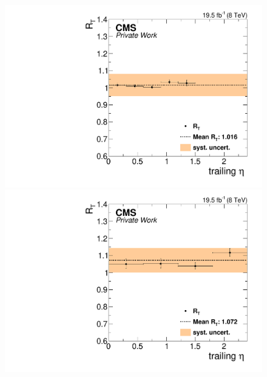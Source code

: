 \begin{figure}[htbp]
\centering
\begin{minipage}[t]{0.49\textwidth}
  \includegraphics[width=\textwidth]{plots/BG/trigger/Triggereff_SFvsOF_Syst_AlphaT_HighHTExclusiveCentral_Full2012_TrailingEta_None.pdf}
\end{minipage}
\begin{minipage}[t]{0.49\textwidth}
\includegraphics[width=\textwidth]{plots/BG/trigger/Triggereff_SFvsOF_Syst_AlphaT_HighHTExclusiveForward_Full2012_TrailingEta_None.pdf}
\end{minipage}
\begin{minipage}[t]{0.49\textwidth}

\end{minipage}
\end{figure}
